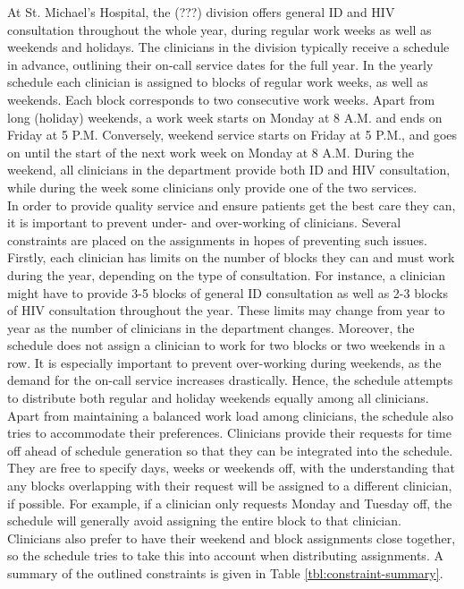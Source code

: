 At St. Michael's Hospital, the (???) division offers general ID and HIV consultation throughout the whole year, during regular work weeks as well as weekends and holidays. The clinicians in the division typically receive a schedule in advance, outlining their on-call service dates for the full year. In the yearly schedule each clinician is assigned to blocks of regular work weeks, as well as weekends. Each block corresponds to two consecutive work weeks. Apart from long (holiday) weekends, a work week starts on Monday at 8 A.M. and ends on Friday at 5 P.M. Conversely, weekend service starts on Friday at 5 P.M., and goes on until the start of the next work week on Monday at 8 A.M. During the weekend, all clinicians in the department provide both ID and HIV consultation, while during the week some clinicians only provide one of the two services. \\

In order to provide quality service and ensure patients get the best care they can, it is important to prevent under- and over-working of clinicians. Several constraints are placed on the assignments in hopes of preventing such issues. Firstly, each clinician has limits on the number of blocks they can and must work during the year, depending on the type of consultation. For instance, a clinician might have to provide 3-5 blocks of general ID consultation as well as 2-3 blocks of HIV consultation throughout the year. These limits may change from year to year as the number of clinicians in the department changes. Moreover, the schedule does not assign a clinician to work for two blocks or two weekends in a row. It is especially important to prevent over-working during weekends, as the demand for the on-call service increases drastically. Hence, the schedule attempts to distribute both regular and holiday weekends equally among all clinicians. \\

Apart from maintaining a balanced work load among clinicians, the schedule also tries to accommodate their preferences. Clinicians provide their requests for time off ahead of schedule generation so that they can be integrated into the schedule. They are free to specify days, weeks or weekends off, with the understanding that any blocks overlapping with their request will be assigned to a different clinician, if possible. For example, if a clinician only requests Monday and Tuesday off, the schedule will generally avoid assigning the entire block to that clinician. Clinicians also prefer to have their weekend and block assignments close together, so the schedule tries to take this into account when distributing assignments. A summary of the outlined constraints is given in Table \ref{tbl:constraint-summary}.

